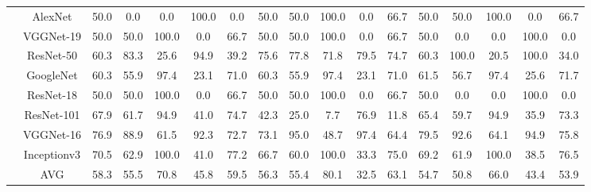 \documentclass[12pt,italian]{article}
\begin{document}
\begin{tiny}
\begin{longtable}{lcccccccccccccccc}
& AlexNet & 50.0 &  0.0 &  0.0 & 100.0 &  0.0 & 50.0 & 50.0 & 100.0 &  0.0 & 66.7 & 50.0 & 50.0 & 100.0 &  0.0 & 66.7 \\ 
& VGGNet-19 & 50.0 & 50.0 & 100.0 &  0.0 & 66.7 & 50.0 & 50.0 & 100.0 &  0.0 & 66.7 & 50.0 &  0.0 &  0.0 & 100.0 &  0.0 \\ 
& ResNet-50 & 60.3 & 83.3 & 25.6 & 94.9 & 39.2 & 75.6 & 77.8 & 71.8 & 79.5 & 74.7 & 60.3 & 100.0 & 20.5 & 100.0 & 34.0 \\ 
& GoogleNet & 60.3 & 55.9 & 97.4 & 23.1 & 71.0 & 60.3 & 55.9 & 97.4 & 23.1 & 71.0 & 61.5 & 56.7 & 97.4 & 25.6 & 71.7 \\ 
& ResNet-18 & 50.0 & 50.0 & 100.0 &  0.0 & 66.7 & 50.0 & 50.0 & 100.0 &  0.0 & 66.7 & 50.0 &  0.0 &  0.0 & 100.0 &  0.0 \\ 
& ResNet-101 & 67.9 & 61.7 & 94.9 & 41.0 & 74.7 & 42.3 & 25.0 &  7.7 & 76.9 & 11.8 & 65.4 & 59.7 & 94.9 & 35.9 & 73.3 \\ 
& VGGNet-16 & 76.9 & 88.9 & 61.5 & 92.3 & 72.7 & 73.1 & 95.0 & 48.7 & 97.4 & 64.4 & 79.5 & 92.6 & 64.1 & 94.9 & 75.8 \\ 
& Inceptionv3 & 70.5 & 62.9 & 100.0 & 41.0 & 77.2 & 66.7 & 60.0 & 100.0 & 33.3 & 75.0 & 69.2 & 61.9 & 100.0 & 38.5 & 76.5 \\ 
\hline
& AVG & 58.3 & 55.5 & 70.8 & 45.8 & 59.5 & 56.3 & 55.4 & 80.1 & 32.5 & 63.1 & 54.7 & 50.8 & 66.0 & 43.4 & 53.9 \\ 
\hline
\bottomrule
\end{longtable} 

 \pagebreak 
\end{tiny} 
 
\end{document}
